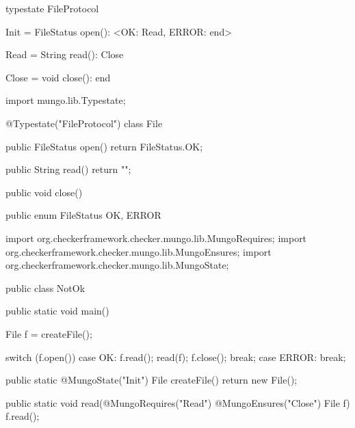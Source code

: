 \begin{code}
typestate FileProtocol {

  Init = {
    FileStatus open(): <OK: Read, ERROR: end>
  }

  Read = {
    String read(): Close
  }

  Close = {
    void close(): end
  }

}\end{code}

\begin{code}
import mungo.lib.Typestate;

@Typestate("FileProtocol")
class File {

  public FileStatus open() {
    return FileStatus.OK;
  }

  public String read() {
    return "";
  }

  public void close() {
  }

}\end{code}

\begin{code}
public enum FileStatus {
  OK, ERROR
}\end{code}

\begin{code}
import org.checkerframework.checker.mungo.lib.MungoRequires;
import org.checkerframework.checker.mungo.lib.MungoEnsures;
import org.checkerframework.checker.mungo.lib.MungoState;

public class NotOk {
  
  public static void main() {
    File f = createFile();

    switch (f.open()) {
      case OK:
        f.read();
        read(f);
        f.close();
        break;
      case ERROR:
        break;
    }
  }
  
  public static @MungoState("Init") File createFile() {
    return new File();
  }

  public static void read(@MungoRequires("Read") @MungoEnsures("Close") File f) {
    f.read();
  }

}\end{code}

